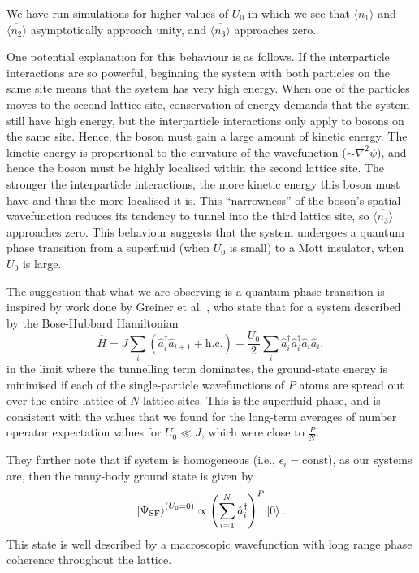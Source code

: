 \documentclass[a4paper, 10pt]{article}
\theoremstyle{plain}
\begin{document}
We have run simulations for higher values of $U_{0}$ in which we see that
$\overline{\langle n_{1} \rangle}$ and $\overline{\langle n_{2} \rangle}$
asymptotically approach unity, and $\overline{\langle n_{3} \rangle}$ approaches
zero.

One potential explanation for this behaviour is as follows. If the interparticle
interactions are so powerful, beginning the system with both particles on
the same site means that the system has very high energy. When one of the
particles moves to the second lattice site, conservation of energy demands
that the system still have high energy, but the interparticle interactions
only apply to bosons on the same site. Hence, the boson must gain a large
amount of kinetic energy. The kinetic energy is proportional to the
curvature of the wavefunction ($\sim \nabla^2\psi$), and hence the boson must be
highly localised within the second lattice site. The stronger the interparticle
interactions, the more kinetic energy this boson must have and thus the more
localised it is. This ``narrowness'' of the boson's spatial wavefunction
reduces its tendency to tunnel into the third lattice site, so
$\overline{\langle n_{3} \rangle}$ approaches zero. This behaviour suggests
that the system undergoes a quantum phase transition from a superfluid (when
$U_{0}$ is small) to a Mott insulator, when $U_{0}$ is large.

The suggestion that what we are observing is a quantum phase transition is
inspired by work done by Greiner et al. \cite{Greiner2002},
who state that for a system described by the Bose-Hubbard Hamiltonian
\begin{equation*}
    \hat{H}
    =
    J \sum_{i}{(\hat{a}^\dagger_{i}\hat{a}_{i+1} + \text{h.c.})} +
    \frac{U_{0}}{2}
    \sum_{i}{\hat{a}^{\dagger}_{i} \hat{a}^{\dagger}_{i} \hat{a}_{i} \hat{a}_{i}},
\end{equation*}
in the limit where the tunnelling term dominates, the ground-state energy is
minimised if each of the single-particle wavefunctions of $P$ atoms are spread
out over the entire lattice of $N$ lattice sites. This is the superfluid phase,
and is consistent with the values that we found for the long-term averages of
number operator expectation values for $U_{0} \ll J$, which were close to
$\frac{P}{N}$.

They further note that if system is homogeneous (i.e., $\epsilon_{i} =
\text{const}$), as our systems are, then the many-body ground state is given by
\begin{equation}
    \ket{\Psi_{\text{SF}}}^{ \left ( U_{0} = 0 \right)}
    \propto
    \left ( \sum_{i=1}^{N}{\hat{a}_{i}^{\dagger}} \right )^{P}
    \ket{0}.
\end{equation}
This state is well described by a macroscopic wavefunction with long range
phase coherence throughout the lattice.
\end{document}
